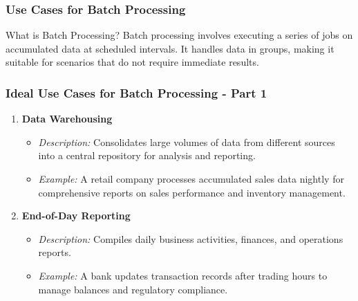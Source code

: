 \documentclass[aspectratio=169]{beamer}
\begin{document}
\begin{frame}[fragile]
    \frametitle{Use Cases for Batch Processing}
    \begin{block}{What is Batch Processing?}
        Batch processing involves executing a series of jobs on accumulated data at scheduled intervals. It handles data in groups, making it suitable for scenarios that do not require immediate results.
    \end{block}
\end{frame}

\begin{frame}[fragile]
    \frametitle{Ideal Use Cases for Batch Processing - Part 1}
    \begin{enumerate}
        \item \textbf{Data Warehousing}
        \begin{itemize}
            \item \textit{Description:} Consolidates large volumes of data from different sources into a central repository for analysis and reporting.
            \item \textit{Example:} A retail company processes accumulated sales data nightly for comprehensive reports on sales performance and inventory management.
        \end{itemize}

        \item \textbf{End-of-Day Reporting}
        \begin{itemize}
            \item \textit{Description:} Compiles daily business activities, finances, and operations reports.
            \item \textit{Example:} A bank updates transaction records after trading hours to manage balances and regulatory compliance.
        \end{itemize}
    \end{enumerate}
\end{frame}
\end{document}

